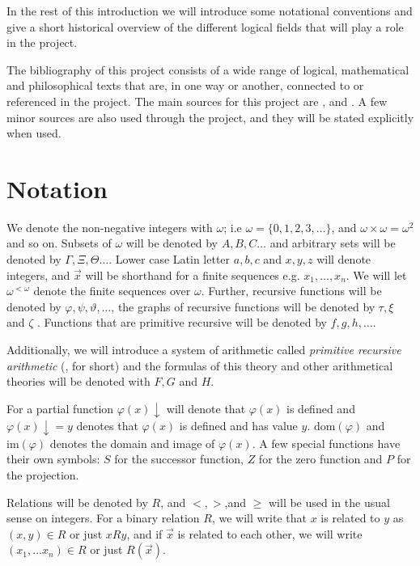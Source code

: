 \documentclass[../main.tex]{subfiles}
\begin{document}
In the rest of this introduction we will introduce some notational
conventions and give a short historical overview of the different logical
fields that will play a role in the project.

The bibliography of this project consists of a wide range of logical,
mathematical and philosophical texts that are, in one way or another, connected to or referenced in the project. 
The main sources for this project
are \citet{Smor1985}, \citet{Boolos1993} and \parencite{Soare1987}. A
few minor sources are also used through the project, and they will be stated
explicitly when used.

\section{Notation}

We denote the non-negative integers with $\omega$; i.e
$\omega=\{0,1,2,3,\ldots\}$, and $\omega\times\omega=\omega^2$ and so on.
Subsets of $\omega$ will be denoted by $A,B,C\ldots$ and arbitrary sets will be
denoted by
$\Gamma,\Xi,\Theta\ldots$. Lower case Latin letter $a,b,c$ and $x,y,z$ will
denote integers, and $\vec{x}$ will be shorthand for a finite sequences e.g. $x_1,\ldots,x_n$.
We will let $\omega^{<\omega}$ denote the finite sequences over $\omega$.
Further, recursive functions will be denoted by
$\varphi,\psi,\vartheta,\ldots$, the graphs of recursive functions will be
denoted by $\tau,\xi$ and $\zeta$ . Functions that are primitive recursive will be denoted by
$f,g,h,\ldots$. 

Additionally, we  will introduce a system of arithmetic called \textit{primitive
recursive arithmetic} (\PRA, for short) and the formulas of this
theory and other arithmetical theories  will be denoted with $F,G$ and $H$.

For a partial function $\varphi(x)\downarrow$ will denote that $\varphi(x)$ is defined and
$\varphi(x)\downarrow=y$ denotes that $\varphi(x)$ is defined and has value $y$.
 $\text{dom}(\varphi)$ and $\text{im}
(\varphi)$ denotes the
domain and image of $\varphi(x)$.
A few special functions have their own symbols: $S$ for the
successor function, $Z$ for the zero function and $P$ for the projection.


Relations will be denoted by $R$, and $<,>$,\leq and $\geq$ will be used in the usual
sense on integers. For a binary relation $R$, we will write that $x$ is related
to $y$ as  $(x,y)\in R$ or just $xRy$, and if $\vec x$ is related to each other, we
will write $(x_1,\ldots x_n)\in R$ or just $R(\vec x)$.
\end{document}

